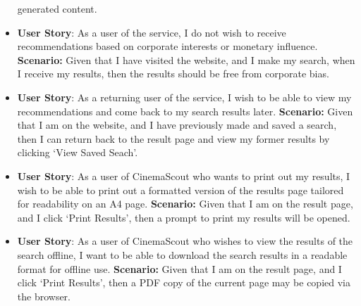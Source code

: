 \documentclass{article}
\begin{document}
\begin{itemize}
generated content.
\item \textbf{User Story}: As a user of the service, I do not wish to receive
recommendations based on corporate interests or monetary influence.
\newline \textbf {Scenario:} Given that I have visited the website, and I make
my search, when I receive my results, then the results should be free from
corporate bias.
\item \textbf{User Story}: As a returning user of the service, I wish to be able
to view my recommendations and come back to my search results later.
\newline \textbf {Scenario:} Given that I am on the website, and I have
previously made and saved a search, then I can return back to the result page 
and view my former results by clicking `View Saved Seach'.
\item \textbf{User Story}: As a user of CinemaScout who wants to print out my
results, I wish to be able to print out a formatted version of the results page
tailored for readability on an A4 page.
\newline \textbf {Scenario:} Given that I am on the result page, and I click
`Print Results', then a prompt to print my results will be opened.
\item \textbf{User Story}: As a user of CinemaScout who wishes to view
the results of the search offline, I want to be able to download the search
results in a readable format for offline use.
\newline \textbf {Scenario:} Given that I am on the result page, and I click
`Print Results', then a PDF copy of the current page may be copied via the
browser.
\end{itemize}
\newpage
\end{document}
